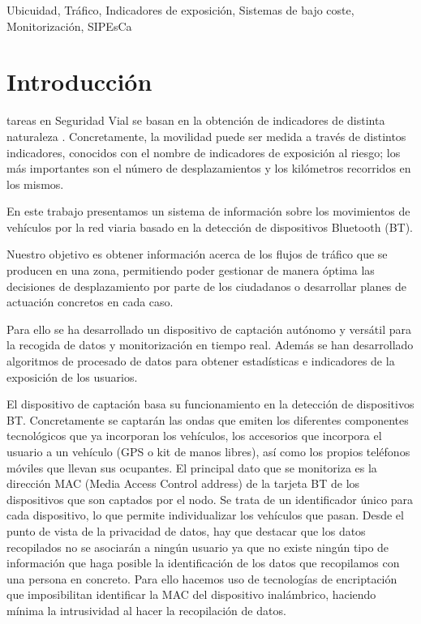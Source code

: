 \documentclass[twocolumn,twoside]{Jornadas}
\begin{document}
\begin{keywords}
Ubicuidad, Tráfico, Indicadores de exposición, Sistemas de bajo coste, Monitorización, SIPEsCa
\end{keywords}


\section{Introducción}
 tareas en Seguridad Vial se basan en la obtención de indicadores de distinta naturaleza \cite{urlDGT}. Concretamente, la movilidad puede ser medida a través de distintos indicadores, conocidos con el nombre de indicadores de exposición al riesgo; los más importantes son el número de desplazamientos y los kilómetros recorridos en los mismos. 

En este trabajo presentamos un sistema de información sobre los movimientos de vehículos por la red viaria basado en la detección de dispositivos Bluetooth (BT). 

Nuestro objetivo es obtener información acerca de los flujos de tráfico que se producen en una zona, permitiendo poder gestionar de manera óptima las 
decisiones de desplazamiento por parte de los ciudadanos o desarrollar planes de actuación concretos en cada caso. 

Para ello se ha desarrollado un dispositivo de captación autónomo y
versátil para la recogida de datos y monitorización en tiempo
real. Además se han desarrollado algoritmos de procesado de datos para
obtener estadísticas e indicadores de la exposición de los usuarios. 

El dispositivo de captación basa su funcionamiento en la detección de dispositivos BT. 
Concretamente se captarán las ondas que emiten los diferentes componentes tecnológicos que ya incorporan los vehículos, 
los accesorios que incorpora el usuario a un vehículo (GPS o kit de manos libres), así como los propios teléfonos móviles que llevan sus ocupantes.
El principal dato que se monitoriza es la dirección MAC (Media Access Control address) de la tarjeta BT de los dispositivos que son captados por el nodo. 
Se trata de un identificador único para cada dispositivo, lo que permite individualizar los vehículos que pasan.
Desde el punto de vista de la privacidad de datos, hay que destacar que los datos recopilados no se asociarán a ningún usuario ya que no existe ningún 
tipo de información que haga posible la identificación de los datos que recopilamos con una persona en concreto. 
Para ello hacemos uso de tecnologías de encriptación que imposibilitan identificar la MAC del dispositivo inalámbrico, haciendo mínima la intrusividad al hacer la recopilación de datos.
\end{document}
